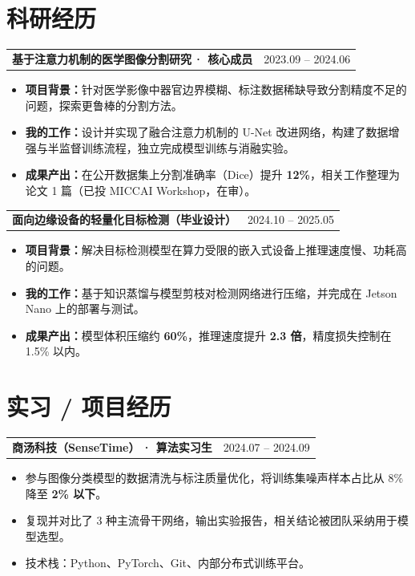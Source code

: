 \documentclass[a4paper,11pt]{article}
\makeatletter
\newcommand{\entryone}[2]{%
  \noindent\begin{tabularx}{\textwidth}{@{}X r@{}}
    \textbf{#1} & #2 \\
  \end{tabularx}%
}
\newcommand{\entrygap}{\vspace{2pt}}
\makeatother
\begin{document}
\section{科研经历}
\entryone{基于注意力机制的医学图像分割研究\,{\normalfont· 核心成员}}{2023.09 -- 2024.06}
\begin{itemize}
    \item \textbf{项目背景：}针对医学影像中器官边界模糊、标注数据稀缺导致分割精度不足的问题，探索更鲁棒的分割方法。
    \item \textbf{我的工作：}设计并实现了融合注意力机制的 U-Net 改进网络，构建了数据增强与半监督训练流程，独立完成模型训练与消融实验。
    \item \textbf{成果产出：}在公开数据集上分割准确率（Dice）提升 \textbf{12\%}，相关工作整理为论文 1 篇（已投 MICCAI Workshop，在审）。
\end{itemize}

\entrygap
\entryone{面向边缘设备的轻量化目标检测（毕业设计）}{2024.10 -- 2025.05}
\begin{itemize}
    \item \textbf{项目背景：}解决目标检测模型在算力受限的嵌入式设备上推理速度慢、功耗高的问题。
    \item \textbf{我的工作：}基于知识蒸馏与模型剪枝对检测网络进行压缩，并完成在 Jetson Nano 上的部署与测试。
    \item \textbf{成果产出：}模型体积压缩约 \textbf{60\%}，推理速度提升 \textbf{2.3 倍}，精度损失控制在 1.5\% 以内。
\end{itemize}

\section{实习 / 项目经历}
\entryone{商汤科技（SenseTime）\,{\normalfont· 算法实习生}}{2024.07 -- 2024.09}
\begin{itemize}
    \item 参与图像分类模型的数据清洗与标注质量优化，将训练集噪声样本占比从 8\% 降至 \textbf{2\% 以下}。
    \item 复现并对比了 3 种主流骨干网络，输出实验报告，相关结论被团队采纳用于模型选型。
    \item 技术栈：Python、PyTorch、Git、内部分布式训练平台。
\end{itemize}
\end{document}
